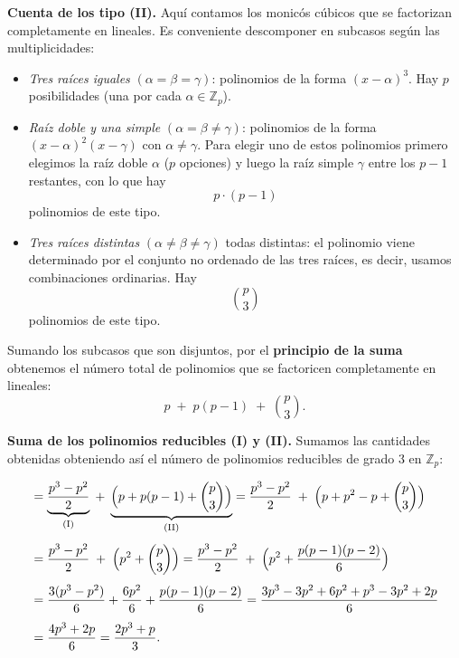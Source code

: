 \documentclass[a4paper,12pt]{article}
\begin{document}
\begin{ejercicio}[title=Ejercicio 28 (⋆)]
\begin{itemize}

\textbf{Cuenta de los tipo (II).}  
Aquí contamos los monicós cúbicos que se factorizan completamente en lineales. Es conveniente descomponer en subcasos según las multiplicidades:

\begin{itemize}
\item \emph{Tres raíces iguales} $(\alpha=\beta=\gamma)$: polinomios de la forma $(x-\alpha)^3$. Hay $p$ posibilidades (una por cada $\alpha\in\mathbb{Z}_p$).

\item \emph{Raíz doble y una simple} $(\alpha=\beta\neq\gamma)$: polinomios de la forma $(x-\alpha)^2(x-\gamma)$ con $\alpha\neq\gamma$.  
  Para elegir uno de estos polinomios primero elegimos la raíz doble $\alpha$ ($p$ opciones) y luego la raíz simple $\gamma$ entre los $p-1$ restantes, con lo que hay
  \[
  p\cdot (p-1)
  \]
  polinomios de este tipo.

\item \emph{Tres raíces distintas} $(\alpha\neq\beta\neq\gamma)$ todas distintas: el polinomio viene determinado por el conjunto no ordenado de las tres raíces, es decir, usamos combinaciones ordinarias. Hay
  \[
  \binom{p}{3}
  \]
  polinomios de este tipo.
\end{itemize}

Sumando los subcasos que son disjuntos, por el \textbf{principio de la suma} obtenemos el número total de polinomios que se factoricen completamente en lineales:
\[
p \;+\; p(p-1) \;+\; \binom{p}{3}.
\]

\bigskip

\textbf{Suma de los polinomios reducibles (I) y (II).}  
Sumamos las cantidades obtenidas obteniendo así el número de polinomios reducibles de grado 3 en $\mathbb{Z}_p$:

\[
\begin{aligned}
&= \underbrace{\frac{p^3-p^2}{2}}_{\text{(I)}} \;+\; \underbrace{\Bigl(p + p(p-1) + \binom{p}{3}\Bigr)}_{\text{(II)}}
= \frac{p^3-p^2}{2} \;+\; \Bigl(p + p^2-p + \binom{p}{3}\Bigr)\\[4pt]
&= \frac{p^3-p^2}{2} \;+\; \Bigl(p^2 + \binom{p}{3}\Bigr)
= \frac{p^3-p^2}{2} \;+\; \Bigl(p^2 + \frac{p(p-1)(p-2)}{6}\Bigr)\\[4pt]
&= \frac{3(p^3-p^2)}{6} + \frac{6p^2}{6} + \frac{p(p-1)(p-2)}{6}
= \frac{3p^3-3p^2 +6p^2 + p^3 -3p^2 +2p}{6}\\[4pt]
&= \frac{4p^3 + 2p}{6}
= \frac{2p^3 + p}{3}.
\end{aligned}
\]

\end{itemize}
\end{ejercicio}
\end{document}
